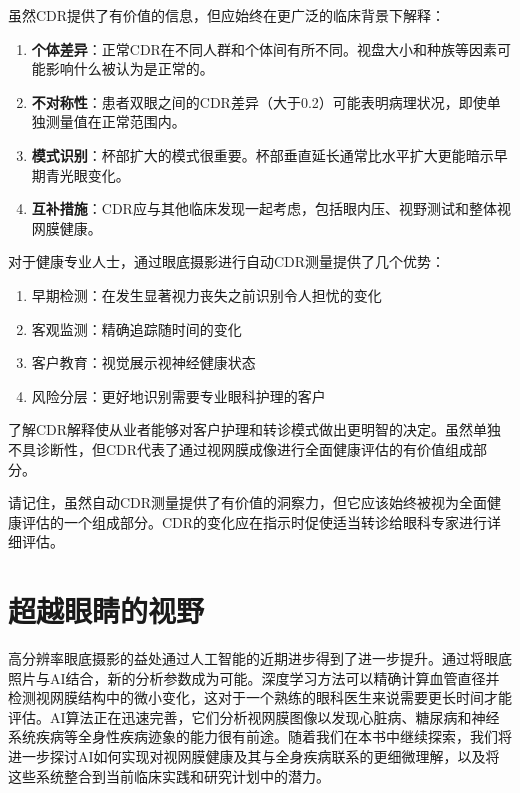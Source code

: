 \documentclass[
  Letterpaper,
]{scrbook}
\providecommand{\tightlist}{%
  \setlength{\itemsep}{0pt}\setlength{\parskip}{0pt}}\usepackage{longtable,booktabs,array}
\begin{document}
虽然CDR提供了有价值的信息，但应始终在更广泛的临床背景下解释：

\begin{enumerate}
\def\labelenumi{\arabic{enumi}.}
\tightlist
\item
  \textbf{个体差异}：正常CDR在不同人群和个体间有所不同。视盘大小和种族等因素可能影响什么被认为是正常的。
\item
  \textbf{不对称性}：患者双眼之间的CDR差异（大于0.2）可能表明病理状况，即使单独测量值在正常范围内。
\item
  \textbf{模式识别}：杯部扩大的模式很重要。杯部垂直延长通常比水平扩大更能暗示早期青光眼变化。
\item
  \textbf{互补措施}：CDR应与其他临床发现一起考虑，包括眼内压、视野测试和整体视网膜健康。
\end{enumerate}

对于健康专业人士，通过眼底摄影进行自动CDR测量提供了几个优势：

\begin{enumerate}
\def\labelenumi{\arabic{enumi}.}
\tightlist
\item
  早期检测：在发生显著视力丧失之前识别令人担忧的变化
\item
  客观监测：精确追踪随时间的变化
\item
  客户教育：视觉展示视神经健康状态
\item
  风险分层：更好地识别需要专业眼科护理的客户
\end{enumerate}

了解CDR解释使从业者能够对客户护理和转诊模式做出更明智的决定。虽然单独不具诊断性，但CDR代表了通过视网膜成像进行全面健康评估的有价值组成部分。

请记住，虽然自动CDR测量提供了有价值的洞察力，但它应该始终被视为全面健康评估的一个组成部分。CDR的变化应在指示时促使适当转诊给眼科专家进行详细评估。

\section{超越眼睛的视野}\label{ux8d85ux8d8aux773cux775bux7684ux89c6ux91ce}

高分辨率眼底摄影的益处通过人工智能的近期进步得到了进一步提升。通过将眼底照片与AI结合，新的分析参数成为可能。深度学习方法可以精确计算血管直径并检测视网膜结构中的微小变化，这对于一个熟练的眼科医生来说需要更长时间才能评估。AI算法正在迅速完善，它们分析视网膜图像以发现心脏病、糖尿病和神经系统疾病等全身性疾病迹象的能力很有前途。随着我们在本书中继续探索，我们将进一步探讨AI如何实现对视网膜健康及其与全身疾病联系的更细微理解，以及将这些系统整合到当前临床实践和研究计划中的潜力。
\end{document}
